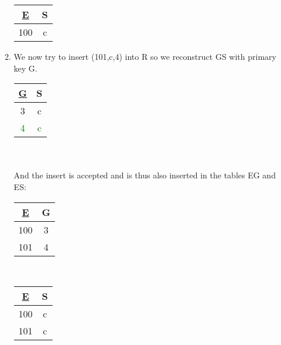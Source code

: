 \documentclass[11pt]{article}
\begin{document}
\begin{enumerate}
\begin{enumerate}
\begin{tabular}{|c|c|}
            \underline{E} & S \\
            \hline
            100 & c \\ 
            \hline
        \end{tabular}
        \item We now try to insert (101,c,4) into R so we reconstruct GS with primary key G.
        \\
        \begin{tabular}{|c|c|} 
            \hline
            \underline{G} & S \\
            \hline
            3 & c \\ 
            \textcolor{green}{4} & \textcolor{green}{c} \\
            \hline
        \end{tabular}
        \\\\ And the insert is accepted and is thus also inserted in the tables EG and ES:
        \\
        \begin{tabular}{|c|c|} 
            \hline
            \underline{E} & G \\
            \hline
            100 & 3 \\ 
            101 & 4 \\
            \hline
        \end{tabular}
        \ \ \ \ \ \ \ \ \ \ \ \ \ \ \ \ 
        \begin{tabular}{|c|c|} 
            \hline
            \underline{E} & S \\
            \hline
            100 & c \\ 
            101 & c \\ 
            \hline
        \end{tabular}
    \end{enumerate}
\end{enumerate}
\end{document}

